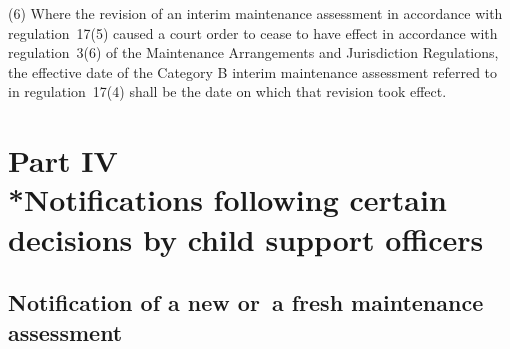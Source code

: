 \documentclass[a4paper,12pt]{article}
\begin{document}
(6) Where the revision of an interim maintenance assessment in accordance with regulation~17(5) caused a court order to cease to have effect in accordance with regulation~3(6) of the Maintenance Arrangements and Jurisdiction Regulations, the effective date of the Category B interim maintenance assessment referred to in regulation~17(4) shall be the date on which that revision took effect.



\section[Part IV --- Notifications following certain decisions by child support officers]{\sloppy Part IV\\*Notifications following certain decisions by child support officers}

\renewcommand\parthead{--- Part IV}

\subsection[10. Notification of a new or~a fresh maintenance assessment]{Notification of a new or~a fresh maintenance assessment}
\end{document}
